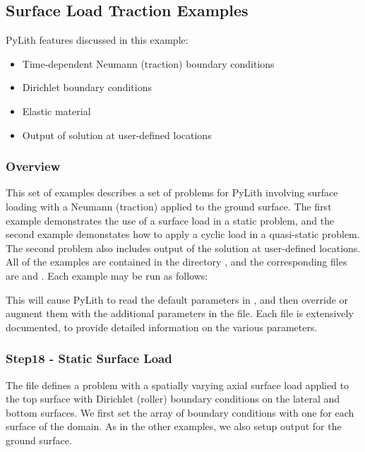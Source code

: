 \subsection{Surface Load Traction Examples}
\label{sec:example:3dhex8:surfload}

PyLith features discussed in this example:
\begin{itemize}
\item Time-dependent Neumann (traction) boundary conditions
\item Dirichlet boundary conditions
\item Elastic material
\item Output of solution at user-defined locations
\end{itemize}

\subsubsection{Overview}

This set of examples describes a set of problems for PyLith involving
surface loading with a Neumann (traction) applied to the ground surface.
The first example demonstrates the use of a surface load in a static
problem, and the second example demonstates how to apply a cyclic
load in a quasi-static problem. The second problem also includes output
of the solution at user-defined locations. All of the examples are
contained in the directory , and the corresponding
 files are  and .
Each example may be run as follows:
This will cause PyLith to read the default parameters in ,
and then override or augment them with the additional parameters in
the  file. Each  file is extensively
documented, to provide detailed information on the various parameters.


\subsubsection{Step18 - Static Surface Load}

The  file defines a problem with a spatially varying
axial surface load applied to the top surface with Dirichlet (roller)
boundary conditions on the lateral and bottom surfaces. We first set
the array of boundary conditions with one for each surface of the
domain. As in the other examples, we also setup output for the ground
surface.

